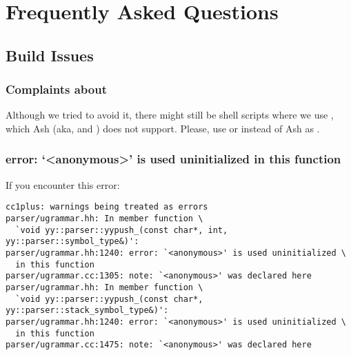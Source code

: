 
\chapter{Frequently Asked Questions}
\label{sec:faq}

\ifx\ifHtml\undefined\else
  \let\subsubsectionSave\subsubsection
  \let\subsubsection\faqsection
\fi

\section{Build Issues}
\label{sec:faq:build}

\subsection{Complaints about \samp{+=}}
Although we tried to avoid it, there might still be shell scripts where we
use \samp{+=}, which Ash (aka,  and ) does not
support.  Please, use  or  instead of Ash as
.

\subsection{error: `\textless{}anonymous\textgreater{}' is used uninitialized in this function}
\label{sec:faq:build:uninitialized}

If you encounter this error:

\begin{verbatim}
cc1plus: warnings being treated as errors
parser/ugrammar.hh: In member function \
  `void yy::parser::yypush_(const char*, int, yy::parser::symbol_type&)':
parser/ugrammar.hh:1240: error: `<anonymous>' is used uninitialized \
  in this function
parser/ugrammar.cc:1305: note: `<anonymous>' was declared here
parser/ugrammar.hh: In member function \
  `void yy::parser::yypush_(const char*, yy::parser::stack_symbol_type&)':
parser/ugrammar.hh:1240: error: `<anonymous>' is used uninitialized \
  in this function
parser/ugrammar.cc:1475: note: `<anonymous>' was declared here
\end{verbatim}

